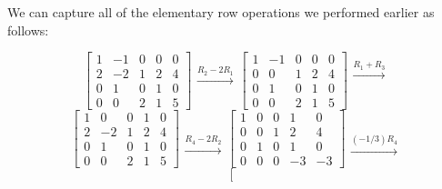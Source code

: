 \documentclass{ximera}
\begin{document}
\begin{exploration}
 We can capture all of the elementary row operations we performed earlier as follows:

$$\left[\begin{array}{cccc|c}  
 1&-1&0&0&0\\2&-2&1&2&4\\0&1&0&1&0\\0&0&2&1&5
 \end{array}\right]
 \begin{array}{c}
 \\
 \xrightarrow{R_2-2R_1}\\
\\
\\
 \end{array}
 \left[\begin{array}{cccc|c}  
 1&-1&0&0&0\\0&0&1&2&4\\0&1&0&1&0\\0&0&2&1&5
 \end{array}\right]
 \begin{array}{c}
 \xrightarrow{R_1+R_3}\\
 \\
\\
\\
 \end{array}$$
 $$\left[\begin{array}{cccc|c}  
 1&0&0&1&0\\2&-2&1&2&4\\0&1&0&1&0\\0&0&2&1&5
 \end{array}\right]
 \begin{array}{c}
 \\
 \\
\\
\xrightarrow{R_4-2R_2}\\
 \end{array}
 \left[\begin{array}{cccc|c}  
 1&0&0&1&0\\0&0&1&2&4\\0&1&0&1&0\\0&0&0&-3&-3
 \end{array}\right]
 \begin{array}{c}
 \\
 \\
\\
\xrightarrow{(-1/3)R_4}\\
 \end{array}$$
 $$\left[\begin{array}{cccc|c}  

\end{array}$$
\end{exploration}
\end{document}
